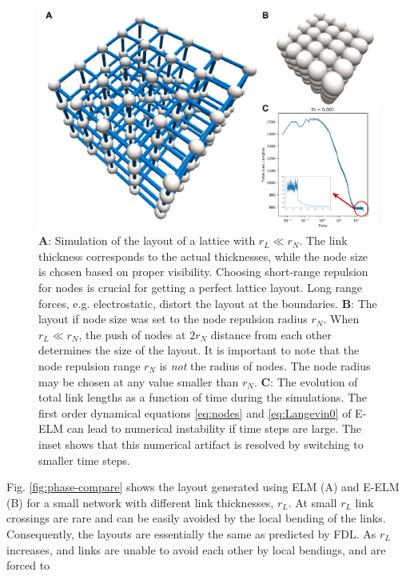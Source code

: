 \documentclass[nofootinbib,preprint,floatfix,titlepage,endfloats]{revtex4} %
\begin{document}
\begin{figure}
    \centering
    \includegraphics[width=\columnwidth]{fig-09-19/lattice-2.pdf}
    \caption{{\bf A}: Simulation of the layout of a lattice with $r_L\ll r_N$. The link thickness corresponds to the actual thicknesses, while the node size is chosen based on proper visibility. Choosing short-range repulsion for nodes is crucial for getting a perfect lattice layout. Long range forces, e.g. electrostatic,  distort the layout at the boundaries. {\bf B}: The layout if node size was set to the node repulsion radius $r_N$. When $r_L\ll r_N$, the push of nodes at $2r_N$ distance from each other determines the size of the layout. It is important to note that the node repulsion range $r_N$ is {\em not} the radius of nodes. The node radius may be chosen at any value smaller than $ r_N$. {\bf C}: The evolution of total link lengths as a function of time during the simulations. The first order dynamical equations \ref{eq:nodes} and \ref{eq:Langevin0} of E-ELM can lead to numerical instability if time steps are large. The inset shows that this numerical artifact is resolved by switching to smaller time steps.}
    \label{fig:lattice}
    \vspace{4cm}
\end{figure}
Fig. \ref{fig:phase-compare} shows the layout generated using ELM (A) and E-ELM (B) for a small %
network %
with different link thicknesses, $r_L$. At small $r_L$ link crossings are rare and can be easily avoided by the local bending of the links. Consequently, 
the layouts are essentially the same as predicted by FDL. As $r_L$ increases, and links are unable to avoid each other by local bendings, and are forced to 
\end{document}
